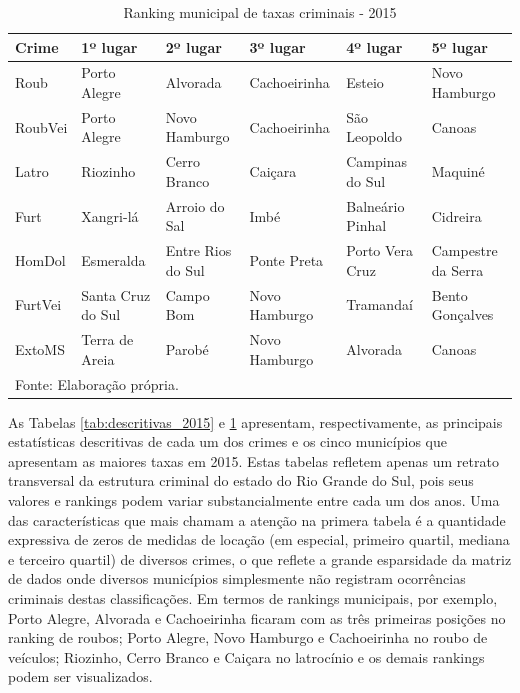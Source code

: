 \documentclass[12pt,openright,oneside,a4paper,english,french,spanish]{abntex2}
\numberwithin{table}{section} %
\numberwithin{figure}{section} %
\begin{document}
\begin{table}[H]
\begin{tiny}
\caption{Ranking municipal de taxas criminais - 2015}
\label{tab:ranking_2015}
\centering
\begin{tabular}{llllll}
  \hline
Crime & 1º lugar & 2º lugar & 3º lugar & 4º lugar & 5º lugar \\ 
  \hline
Roub & Porto Alegre & Alvorada & Cachoeirinha & Esteio & Novo Hamburgo \\ 
RoubVei & Porto Alegre & Novo Hamburgo & Cachoeirinha & São Leopoldo & Canoas \\ 
Latro & Riozinho & Cerro Branco & Caiçara & Campinas do Sul & Maquiné \\ 
Furt & Xangri-lá & Arroio do Sal & Imbé & Balneário Pinhal & Cidreira \\ 
HomDol & Esmeralda & Entre Rios do Sul & Ponte Preta & Porto Vera Cruz & Campestre da Serra \\ 
FurtVei & Santa Cruz do Sul & Campo Bom & Novo Hamburgo & Tramandaí & Bento Gonçalves \\ 
ExtoMS & Terra de Areia & Parobé & Novo Hamburgo & Alvorada & Canoas \\ 
   \hline
\multicolumn{6}{l}{Fonte: Elaboração própria.}
\end{tabular}
\end{tiny}
\end{table}

As Tabelas \ref{tab:descritivas_2015} e \ref{tab:ranking_2015} apresentam, respectivamente, as principais estatísticas descritivas de cada um dos crimes e os cinco municípios que apresentam as maiores taxas em 2015. Estas tabelas refletem apenas um retrato transversal da estrutura criminal do estado do Rio Grande do Sul, pois seus valores e rankings podem variar substancialmente entre cada um dos anos. Uma das características que mais chamam a atenção na primera tabela é a quantidade expressiva de zeros de medidas de locação (em especial, primeiro quartil, mediana e terceiro quartil) de diversos crimes, o que reflete a grande esparsidade da matriz de dados onde diversos municípios simplesmente não registram ocorrências criminais destas classificações. Em termos de rankings municipais, por exemplo, Porto Alegre, Alvorada e Cachoeirinha ficaram com as três primeiras posições no ranking de roubos; Porto Alegre, Novo Hamburgo e Cachoeirinha no roubo de veículos; Riozinho, Cerro Branco e Caiçara no latrocínio e os demais rankings podem ser visualizados.
\end{document}
